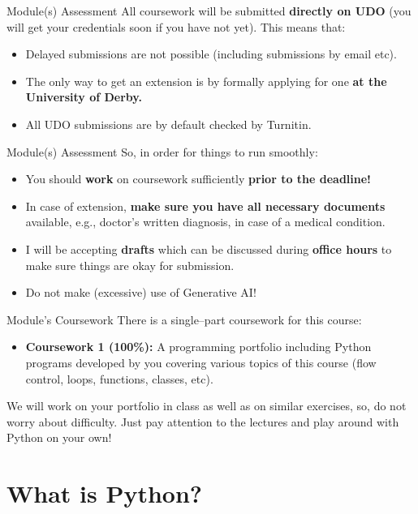 \documentclass[aspectratio=169, 12pt, xcolor=table]{beamer}
\begin{document}
	\begin{headsup}{Module(s) Assessment}
		All coursework will be submitted \textbf{directly on UDO} (you will get your credentials soon if you have not yet). This means that:
		\begin{itemize}
			\item Delayed submissions are not possible (including submissions by email etc).
			\item The only way to get an extension is by formally applying for one \textbf{at the University of Derby.}
			\item All UDO submissions are by default checked by Turnitin.
		\end{itemize}
	\end{headsup}

	\begin{headsup}{Module(s) Assessment}
		So, in order for things to run smoothly:
		\begin{itemize}
			\item You should \textbf{work} on coursework sufficiently \textbf{prior to the deadline!}
			\item In case of extension, \textbf{make sure you have all necessary documents} available, e.g., doctor's written diagnosis, in case of a medical condition.
			\item I will be accepting \textbf{drafts} which can be discussed during \textbf{office hours} to make sure things are okay for submission.
			\item Do not make (excessive) use of Generative AI!
		\end{itemize}
	\end{headsup}

	\begin{frame}{Module's Coursework}
		There is a single--part coursework for this course:
		\begin{itemize}
			\item \textbf{Coursework 1 (100\%):} A programming portfolio including Python programs developed by you covering various topics of this course (flow control, loops, functions, classes, etc).
		\end{itemize}
		
		We will work on your portfolio in class as well as on similar exercises, so, do not worry about difficulty. Just pay attention to the lectures and play around with Python on your own!
	\end{frame}

	\section{What is Python?}\label{sec:what-is-python}
	
\end{document}

